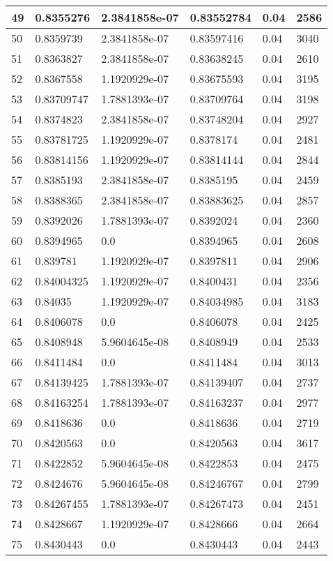 \begin{longtable}{|l|l|l|l|l|l|}
49 & 0.8355276 & 2.3841858e-07 & 0.83552784 & 0.04 & 2586 \\ \hline 
50 & 0.8359739 & 2.3841858e-07 & 0.83597416 & 0.04 & 3040 \\ \hline 
51 & 0.8363827 & 2.3841858e-07 & 0.83638245 & 0.04 & 2610 \\ \hline 
52 & 0.8367558 & 1.1920929e-07 & 0.83675593 & 0.04 & 3195 \\ \hline 
53 & 0.83709747 & 1.7881393e-07 & 0.83709764 & 0.04 & 3198 \\ \hline 
54 & 0.8374823 & 2.3841858e-07 & 0.83748204 & 0.04 & 2927 \\ \hline 
55 & 0.83781725 & 1.1920929e-07 & 0.8378174 & 0.04 & 2481 \\ \hline 
56 & 0.83814156 & 1.1920929e-07 & 0.83814144 & 0.04 & 2844 \\ \hline 
57 & 0.8385193 & 2.3841858e-07 & 0.8385195 & 0.04 & 2459 \\ \hline 
58 & 0.8388365 & 2.3841858e-07 & 0.83883625 & 0.04 & 2857 \\ \hline 
59 & 0.8392026 & 1.7881393e-07 & 0.8392024 & 0.04 & 2360 \\ \hline 
60 & 0.8394965 & 0.0 & 0.8394965 & 0.04 & 2608 \\ \hline 
61 & 0.839781 & 1.1920929e-07 & 0.8397811 & 0.04 & 2906 \\ \hline 
62 & 0.84004325 & 1.1920929e-07 & 0.8400431 & 0.04 & 2356 \\ \hline 
63 & 0.84035 & 1.1920929e-07 & 0.84034985 & 0.04 & 3183 \\ \hline 
64 & 0.8406078 & 0.0 & 0.8406078 & 0.04 & 2425 \\ \hline 
65 & 0.8408948 & 5.9604645e-08 & 0.8408949 & 0.04 & 2533 \\ \hline 
66 & 0.8411484 & 0.0 & 0.8411484 & 0.04 & 3013 \\ \hline 
67 & 0.84139425 & 1.7881393e-07 & 0.84139407 & 0.04 & 2737 \\ \hline 
68 & 0.84163254 & 1.7881393e-07 & 0.84163237 & 0.04 & 2977 \\ \hline 
69 & 0.8418636 & 0.0 & 0.8418636 & 0.04 & 2719 \\ \hline 
70 & 0.8420563 & 0.0 & 0.8420563 & 0.04 & 3617 \\ \hline 
71 & 0.8422852 & 5.9604645e-08 & 0.8422853 & 0.04 & 2475 \\ \hline 
72 & 0.8424676 & 5.9604645e-08 & 0.84246767 & 0.04 & 2799 \\ \hline 
73 & 0.84267455 & 1.7881393e-07 & 0.84267473 & 0.04 & 2451 \\ \hline 
74 & 0.8428667 & 1.1920929e-07 & 0.8428666 & 0.04 & 2664 \\ \hline 
75 & 0.8430443 & 0.0 & 0.8430443 & 0.04 & 2443 \\ \hline 
\end{longtable}